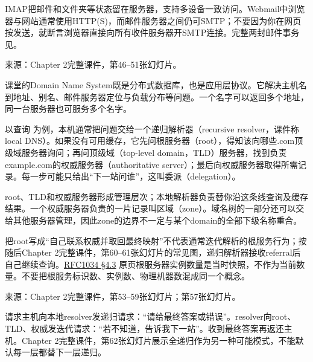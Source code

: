 IMAP把邮件和文件夹等状态留在服务器，支持多设备一致访问。Webmail中浏览器与网站通常使用HTTP(S)，而邮件服务器之间仍可SMTP；不要因为你在网页按发送，就断言浏览器直接向所有收件服务器开SMTP连接。完整两封邮件事务见。


来源：Chapter 2完整课件，第46–51张幻灯片。





课堂的Domain Name System既是分布式数据库，也是应用层协议。它解决主机名到地址、别名、邮件服务器定位与负载分布等问题。一个名字可以返回多个地址，同一台服务器也可服务多个名字。


以查询  为例，本机通常把问题交给一个递归解析器（recursive resolver，课件称local DNS）。如果没有可用缓存，它先问根服务器（root），得知该向哪些.com顶级域服务器询问；再问顶级域（top-level domain，TLD）服务器，找到负责example.com的权威服务器（authoritative server）；最后向权威服务器取得所需记录。每一步可能只给出“下一站问谁”，这叫委派（delegation）。


root、TLD和权威服务器形成管理层次；本地解析器负责替你沿这条线查询及缓存结果。一个权威服务器负责的一片记录叫区域（zone）。域名树的一部分还可以交给其他服务器管理，因此zone的边界不一定与某个domain的全部下级名称重合。


把root写成“自己联系权威并取回最终映射”不代表通常迭代解析的根服务行为；按随后Chapter 2完整课件，第60–61张幻灯片的常见图，递归解析器接收referral后自己继续查询。\href{https://www.rfc-editor.org/rfc/rfc1034}{RFC1034 §4.3} 原页根服务器实例数量是当时快照，不作为当前数量。不要把根服务标识数、实例数、物理机器数混成同一个概念。


来源：Chapter 2完整课件，第53–59张幻灯片；第57张幻灯片。








请求主机向本地resolver发递归请求：“请给最终答案或错误”。resolver向root、TLD、权威发迭代请求：“若不知道，告诉我下一站”。收到最终答案再返还主机。Chapter 2完整课件，第62张幻灯片展示全递归作为另一种可能模式，不能默认每一层都替下一层递归。




